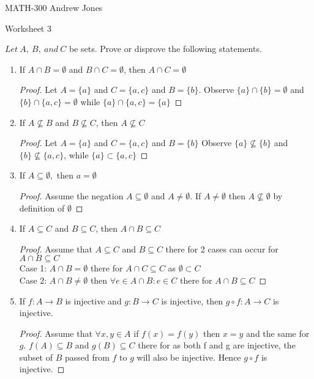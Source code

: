 \documentclass{article}
\begin{document}
  MATH-300 \hfill Andrew Jones
  \begin{center}
  {\huge Worksheet 3}
  \end{center}
  $Let\ A,\ B,\ and\ C$ be sets. Prove or disprove the following statements. \\
  \begin{enumerate}
  \item If $A\cap B = \emptyset$ and $B\cap C = \emptyset$, then $A\cap C = \emptyset$
    \begin{proof}
      Let $A = \{a\}$ and $C = \{a, c\}$ and $B = \{b\}$.
      Observe $\{a\}\cap \{b\} = \emptyset$ and $\{b\}\cap \{a, c\} = \emptyset$ while $\{a\}\cap \{a,c\} = \{a\}$
    \end{proof}
  \item If $A\not\subseteq B$ and $B\not\subseteq C$, then $A\not\subseteq C$ 
    \begin{proof}
      Let $A = \{a\}$ and $C = \{a, c\}$ and $B = \{b\}$ 
      Observe $\{a\}\not\subseteq \{b\}$ and $\{b\}\not\subseteq \{a, c\}$, while $\{a\}\subset \{a, c\}$
    \end{proof}
  \item If $A\subseteq \emptyset,$ then $a= \emptyset$ 
    \begin{proof}
      Assume the negation $A\subseteq \emptyset$ and $A \neq \emptyset$.
      If $A \neq \emptyset$ then $A\not\subseteq \emptyset$ by definition of $\emptyset$ 
    \end{proof}
  \item If $A\subseteq C$ and $B\subseteq C$, then $A\cap B\subseteq C$
    \begin{proof}
     Assume that $A\subseteq C$ and $B\subseteq C$ there for 2 cases can occur for $A\cap B\subseteq C$ \\
     Case 1: $A\cap B = \emptyset$ there for $A\cap C\subseteq C$ as $\emptyset \subset C$ \\
     Case 2: $A\cap B \neq \emptyset$ then $\forall e\in A\cap B: e\in C$ there for $A\cap B \subseteq C$
   \end{proof}
  \item If $f : A\to B$ is injective and $g : B\to C$ is injective, then $g \circ f : A\to C$ is injective. 
    \begin{proof}
      Assume that $\forall x,y\in A$ if $f(x) = f(y)$ then $x = y$ and the same for $g$. $f(A) \subseteq B$ and $g(B) \subseteq C$ there for as both f and g are injective, the subset of $B$ passed from $f$ to $g$ will also be injective. Hence $g \circ f$ is injective.

\end{proof}
\end{enumerate}
\end{document}

